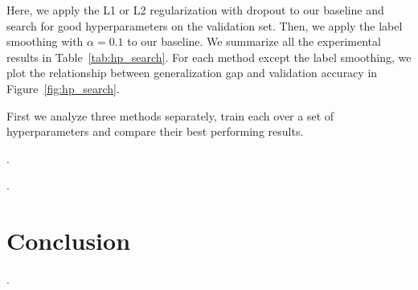 \documentclass{article}
\begin{document}
Here, we apply the L1 or L2 regularization with dropout to our baseline and search for good hyperparameters on the validation set. 
Then, we apply the label smoothing with $\alpha=0.1$ to our baseline.
We summarize all the experimental results in Table~\ref{tab:hp_search}. For each method except the label smoothing, we plot the relationship between generalization gap and validation accuracy in Figure~\ref{fig:hp_search}.

First we analyze three methods separately, train each over a set of hyperparameters and compare their best performing results.

\questionSix.

\questionSeven.


\section{Conclusion}
\label{sec:concl}
    
\questionEight.

\newpage

\end{document}
